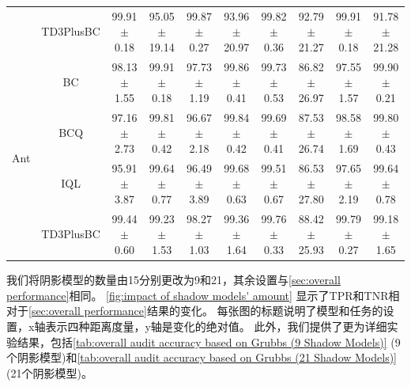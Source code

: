 \begin{table}[!ht]
\begin{tabular}{cccccccccc}
                                                                                           & TD3PlusBC                                                                                  & 99.91$\pm$0.18  & 95.05$\pm$19.14 & 99.87$\pm$0.27 & 93.96$\pm$20.97 & 99.82$\pm$0.36 & 92.79$\pm$21.27                              & 99.91$\pm$0.18 & 91.78$\pm$21.28                                    \\ 
    \cline{2-10}
    \multirow{4}{*}{Ant}                                                                   & BC                                                                                         & 98.13$\pm$1.55  & 99.91$\pm$0.18  & 97.73$\pm$1.19 & 99.86$\pm$0.41  & 99.73$\pm$0.53 & 86.82$\pm$26.97                              & 97.55$\pm$1.57 & 99.90$\pm$0.21                                     \\
                                                                                           & BCQ                                                                                        & 97.16$\pm$2.73  & 99.81$\pm$0.42  & 96.67$\pm$2.18 & 99.84$\pm$0.42  & 99.69$\pm$0.41 & 87.53$\pm$26.74                              & 98.58$\pm$1.69 & 99.80$\pm$0.43                                     \\
                                                                                           & IQL                                                                                        & 95.91$\pm$3.87  & 99.64$\pm$0.77  & 96.49$\pm$3.89 & 99.68$\pm$0.63  & 99.51$\pm$0.67 & 86.53$\pm$27.80                              & 97.65$\pm$2.19 & 99.64$\pm$0.78                                     \\
                                                                                           & TD3PlusBC                                                                                  & 99.44$\pm$0.60  & 99.23$\pm$1.53  & 98.27$\pm$1.03 & 99.36$\pm$1.64  & 99.76$\pm$0.33 & 88.42$\pm$25.93                              & 99.79$\pm$0.27 & 99.18$\pm$1.65                                     \\
    \bottomrule
    \end{tabular}
\end{table}
    

我们将阴影模型的数量由15分别更改为9和21，其余设置与\autoref{sec:overall performance}相同。 
\autoref{fig:impact of shadow models' amount} 显示了TPR和TNR相对于\autoref{sec:overall performance}结果的变化。
每张图的标题说明了模型和任务的设置，x轴表示四种距离度量，y轴是变化的绝对值。
此外，我们提供了更为详细实验结果，包括\autoref{tab:overall audit accuracy based on Grubbs (9 Shadow Models)} (9个阴影模型)和\autoref{tab:overall audit accuracy based on Grubbs (21 Shadow Models)} (21个阴影模型)。

